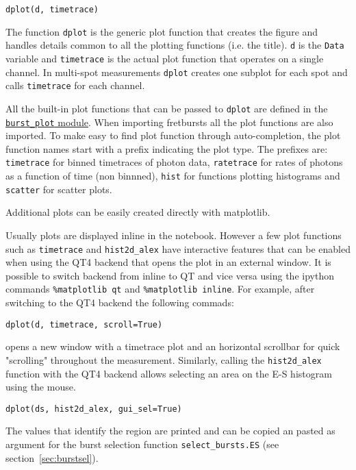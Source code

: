 \begin{verbatim}
dplot(d, timetrace)
\end{verbatim}

The function \verb|dplot| is the generic plot function that creates the figure
and handles details common to all the plotting functions (i.e. the title).
\verb|d| is the \verb|Data| variable and \verb|timetrace| is the actual plot
function that operates on a single channel. In multi-spot measurements
\verb|dplot| creates one subplot for each spot and calls \verb|timetrace| for
each channel.

All the built-in plot functions that can be passed to 
\verb|dplot| are defined in the 
\href{http://fretbursts.readthedocs.org/en/latest/plots.html}{\texttt{burst\_plot} module}. 
When importing fretbursts all the plot functions are also imported. 
To make easy to find plot function through auto-completion, 
the plot function names start with a prefix indicating the
plot type. The prefixes are: \verb|timetrace| for binned timetraces
of photon data, \verb|ratetrace| for rates of photons as a function of time (non
binnned), \verb|hist| for functions plotting histograms and \verb|scatter| for
scatter plots.

Additional plots can be easily created directly with matplotlib.

Usually plots are displayed inline in the notebook. However a few plot functions
 such as \verb|timetrace| and \verb|hist2d_alex| have interactive features that
can be enabled when using the QT4 backend that opens the plot in an external
window. It is possible to switch backend from inline to QT and vice versa using
the ipython commands \verb|%matplotlib qt|
and \verb|%matplotlib inline|. For example, after switching to the QT4 backend
the following commads:

\begin{verbatim}
dplot(d, timetrace, scroll=True)
\end{verbatim}

opens a new window with a timetrace plot and an horizontal scrollbar for quick
"scrolling" throughout the measurement.
Similarly, calling the \verb|hist2d_alex| function with the QT4 backend allows
selecting an area on the E-S histogram using the mouse.

\begin{verbatim}
dplot(ds, hist2d_alex, gui_sel=True)
\end{verbatim}

The values that identify the region are printed and can be copied an pasted as
argument for the burst selection function \verb|select_bursts.ES| (see
section~\ref{sec:burstsel}).

